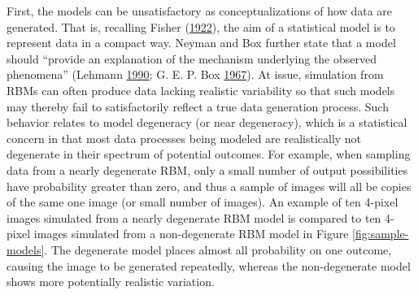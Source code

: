 \documentclass[]{article}
\theoremstyle{definition}
\begin{document}
First, the models can be unsatisfactory as conceptualizations of how
data are generated. That is, recalling Fisher
(\protect\hyperlink{ref-fisher1922mathematical}{1922}), the aim of a
statistical model is to represent data in a compact way. Neyman and Box
further state that a model should ``provide an explanation of the
mechanism underlying the observed phenomena'' (Lehmann
\protect\hyperlink{ref-lehmann1990model}{1990}; G. E. P. Box
\protect\hyperlink{ref-box1967discrimination}{1967}). At issue,
simulation from RBMs can often produce data lacking realistic
variability so that such models may thereby fail to satisfactorily
reflect a true data generation process. Such behavior relates to model
degeneracy (or near degeneracy), which is a statistical concern in that
most data processes being modeled are realistically not degenerate in
their spectrum of potential outcomes. For example, when sampling data
from a nearly degenerate RBM, only a small number of output
possibilities have probability greater than zero, and thus a sample of
images will all be copies of the same one image (or small number of
images). An example of ten 4-pixel images simulated from a nearly
degenerate RBM model is compared to ten 4-pixel images simulated from a
non-degenerate RBM model in Figure \ref{fig:sample-models}. The
degenerate model places almost all probability on one outcome, causing
the image to be generated repeatedly, whereas the non-degenerate model
shows more potentially realistic variation.
\end{document}
